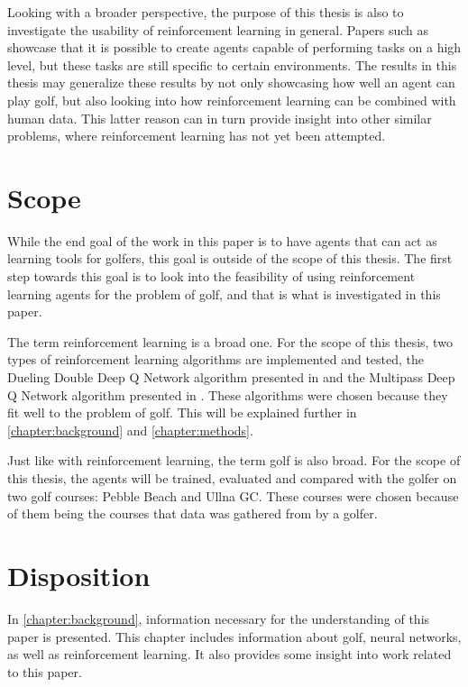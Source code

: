 \documentclass{kththesis}
\begin{document}
Looking with a broader perspective, the purpose of this thesis is also to investigate the usability of reinforcement learning in general. Papers such as \parencite{mnih2015human} showcase that it is possible to create agents capable of performing tasks on a high level, but these tasks are still specific to certain environments. The results in this thesis may generalize these results by not only showcasing how well an agent can play golf, but also looking into how reinforcement learning can be combined with human data. This latter reason can in turn provide insight into other similar problems, where reinforcement learning has not yet been attempted. 

\section{Scope}
While the end goal of the work in this paper is to have agents that can act as learning tools for golfers, this goal is outside of the scope of this thesis. The first step towards this goal is to look into the feasibility of using reinforcement learning agents for the problem of golf, and that is what is investigated in this paper.

The term reinforcement learning is a broad one. For the scope of this thesis, two types of reinforcement learning algorithms are implemented and tested, the Dueling Double Deep Q Network algorithm presented in \parencite{wang2015dueling} and the Multipass Deep Q Network algorithm presented in \parencite{bester2019mpdqn}. These algorithms were chosen because they fit well to the problem of golf. This will be explained further in \autoref{chapter:background} and \autoref{chapter:methods}.

Just like with reinforcement learning, the term golf is also broad. For the scope of this thesis, the agents will be trained, evaluated and compared with the golfer on two golf courses: Pebble Beach and Ullna GC. These courses were chosen because of them being the courses that data was gathered from by a golfer. 

\section{Disposition}
In \autoref{chapter:background}, information necessary for the understanding of this paper is presented. This chapter includes information about golf, neural networks, as well as reinforcement learning. It also provides some insight into work related to this paper.
\end{document}
